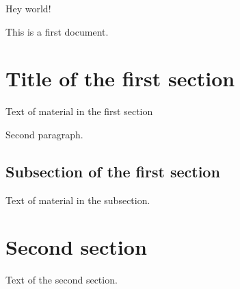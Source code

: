 \documentclass{article}
\begin{document}
Hey world!

This is a first document.

\section{Title of the first section}

Text of material in the first section

Second paragraph.

\subsection{Subsection of the first section}

Text of material in the subsection.

\section{Second section}

Text of the second section.
\end{document}
